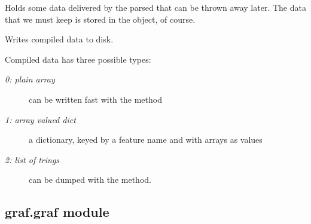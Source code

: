 \documentclass[letterpaper,10pt,english]{sphinxmanual}
\begin{document}
\begin{fulllineitems}
\begin{fulllineitems}
\end{fulllineitems}


\begin{fulllineitems}
\label{graf/graf:graf.compiler.GrafCompiler.temp_data_items}
Holds some data delivered by the parsed that can be thrown away later. The data that we must keep is stored in the object, of course.

\end{fulllineitems}


\begin{fulllineitems}
\label{graf/graf:graf.compiler.GrafCompiler.write_data}
Writes compiled data to disk.

Compiled data has three possible types:
\begin{description}
\item[{\emph{0: plain array}}] \leavevmode
can be written fast with the  method

\item[{\emph{1: array valued dict}}] \leavevmode
a dictionary, keyed by a feature name and with arrays as values

\item[{\emph{2: list of trings}}] \leavevmode
can be dumped with the  method.

\end{description}

\end{fulllineitems}


\end{fulllineitems}



\subsection{graf.graf module}
\label{graf/graf:module-graf.graf}\label{graf/graf:graf-graf-module}
\end{document}
